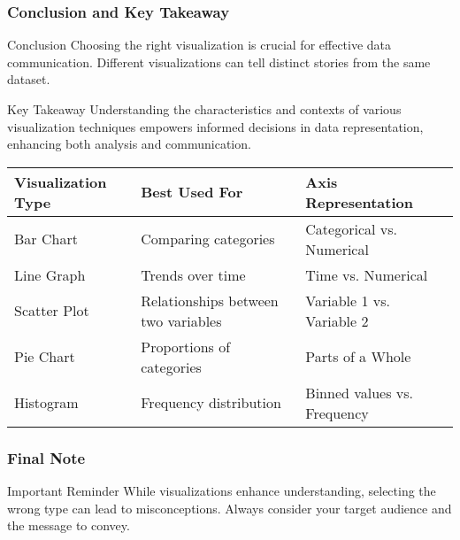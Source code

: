 \documentclass[aspectratio=169]{beamer}
\begin{document}
\begin{frame}[fragile]
    \frametitle{Conclusion and Key Takeaway}
    \begin{block}{Conclusion}
        Choosing the right visualization is crucial for effective data communication. Different visualizations can tell distinct stories from the same dataset.
    \end{block}
    
    \begin{block}{Key Takeaway}
        Understanding the characteristics and contexts of various visualization techniques empowers informed decisions in data representation, enhancing both analysis and communication.
    \end{block}
    
    \begin{table}[h]
        \centering
        \begin{tabular}{|l|l|l|} 
            \hline
            \textbf{Visualization Type} & \textbf{Best Used For}                  & \textbf{Axis Representation}   \\ 
            \hline
            Bar Chart                   & Comparing categories                    & Categorical vs. Numerical      \\ 
            \hline
            Line Graph                  & Trends over time                       & Time vs. Numerical             \\ 
            \hline
            Scatter Plot                & Relationships between two variables     & Variable 1 vs. Variable 2      \\ 
            \hline
            Pie Chart                   & Proportions of categories              & Parts of a Whole               \\ 
            \hline
            Histogram                   & Frequency distribution                 & Binned values vs. Frequency     \\ 
            \hline
        \end{tabular}
    \end{table}
\end{frame}

\begin{frame}[fragile]
    \frametitle{Final Note}
    \begin{block}{Important Reminder}
        While visualizations enhance understanding, selecting the wrong type can lead to misconceptions. Always consider your target audience and the message to convey.
    \end{block}
\end{frame}
\end{document}
